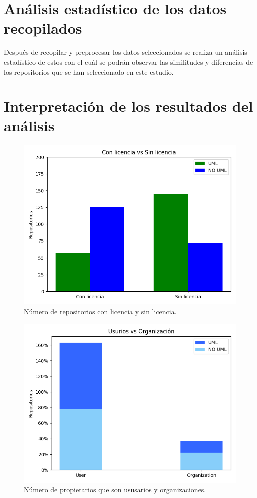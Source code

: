 \documentclass[a4paper, 12pt]{book}
\begin{document}
\section{Análisis estadístico de los datos recopilados}
\label{sec:análisis descriptivo de los datos recopilado}

Después de recopilar y preprocesar los datos seleccionados se realiza un análisis estadístico de estos con el cuál se podrán observar las similitudes y diferencias de los repositorios que se han seleccionado en este estudio.


\section{Interpretación de los resultados del análisis}
\label{sec:interpretación de los resultados del análisis}



\begin{figure}
  \centering
  \includegraphics[width=12cm, keepaspectratio]{img/Figure_license.png}
  \caption{Número de repositorios con licencia y sin licencia.}\label{fig:Figure_license}
\end{figure}



\begin{figure}
  \centering
  \includegraphics[width=12cm, keepaspectratio]{img/Figure_typeDeveloper.png}
  \caption{Número de propietarios que son ususarios y organizaciones.}\label{fig:Figure_typeDeveloper}
\end{figure}
\end{document}
